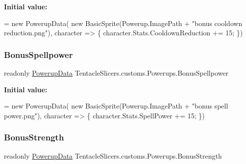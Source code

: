 {\bfseries Initial value\+:}
\begin{DoxyCode}
= \textcolor{keyword}{new} PowerupData(
            \textcolor{keyword}{new} BasicSprite(Powerup.ImagePath + \textcolor{stringliteral}{"bonus cooldown reduction.png"}), character =>
            \{
                character.Stats.CooldownReduction += 15;
            \})
\end{DoxyCode}
\mbox{\label{class_tentacle_slicers_1_1customs_1_1_powerups_afbb7cc9d7dfd8026d9a91dddef51a703}} 
\subsubsection{\texorpdfstring{Bonus\+Spellpower}{BonusSpellpower}}
{\footnotesize\ttfamily readonly \hyperlink{class_tentacle_slicers_1_1actors_1_1_powerup_data}{Powerup\+Data} Tentacle\+Slicers.\+customs.\+Powerups.\+Bonus\+Spellpower\hspace{0.3cm}{\ttfamily [static]}}

{\bfseries Initial value\+:}
\begin{DoxyCode}
= \textcolor{keyword}{new} PowerupData(
            \textcolor{keyword}{new} BasicSprite(Powerup.ImagePath + \textcolor{stringliteral}{"bonus spell power.png"}), character =>
            \{
                character.Stats.SpellPower += 15;
            \})
\end{DoxyCode}
\mbox{\label{class_tentacle_slicers_1_1customs_1_1_powerups_a03cdb68b2b0c49b586f25b69b9dc3d90}} 
\subsubsection{\texorpdfstring{Bonus\+Strength}{BonusStrength}}
{\footnotesize\ttfamily readonly \hyperlink{class_tentacle_slicers_1_1actors_1_1_powerup_data}{Powerup\+Data} Tentacle\+Slicers.\+customs.\+Powerups.\+Bonus\+Strength\hspace{0.3cm}{\ttfamily [static]}}

